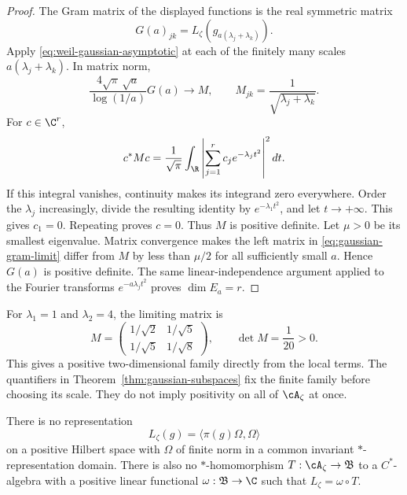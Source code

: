 \begin{proof}
The Gram matrix of the displayed functions is the real symmetric matrix
\[
 G(a)_{jk}=L_\zeta(g_{a(\lambda_j+\lambda_k)}).
\]
Apply \eqref{eq:weil-gaussian-asymptotic} at each of the finitely many
scales $a(\lambda_j+\lambda_k)$.  In matrix norm,
\begin{equation}
 \frac{4\sqrt\pi\,\sqrt a}{\log(1/a)}G(a)
 \longrightarrow M,
 \qquad M_{jk}=\frac1{\sqrt{\lambda_j+\lambda_k}}.
 \label{eq:gaussian-gram-limit}
\end{equation}
For $c\in\C^r$,
\begin{equation}
 c^*Mc=\frac1{\sqrt\pi}\int_{\R}
       \left|\sum_{j=1}^r c_j e^{-\lambda_j t^2}\right|^2dt.
 \label{eq:limiting-gaussian-gram}
\end{equation}
If this integral vanishes, continuity makes its integrand zero everywhere.
Order the $\lambda_j$ increasingly, divide the resulting identity by
$e^{-\lambda_1t^2}$, and let $t\to+\infty$.
This gives $c_1=0$.  Repeating proves $c=0$.
Thus $M$ is positive definite.
Let $\mu>0$ be its smallest eigenvalue.  Matrix convergence makes the
left matrix in \eqref{eq:gaussian-gram-limit} differ from $M$ by less
than $\mu/2$ for all sufficiently small $a$.
Hence $G(a)$ is positive definite.
The same linear-independence argument applied to the Fourier transforms
$e^{-a\lambda_jt^2}$ proves $\dim E_a=r$.
\end{proof}

For $\lambda_1=1$ and $\lambda_2=4$, the limiting matrix is
\[
 M=\begin{pmatrix}1/\sqrt2&1/\sqrt5\\1/\sqrt5&1/\sqrt8\end{pmatrix},
 \qquad\det M=\frac1{20}>0.
\]
This gives a positive two-dimensional family directly from the local terms.
The quantifiers in Theorem~\ref{thm:gaussian-subspaces} fix the finite family
before choosing its scale.  They do not imply positivity on all of
$\cA_\zeta$ at once.

\begin{corollary}
\label{cor:weil-carriers}
There is no representation
\[
 L_\zeta(g)=\langle\pi(g)\Omega,\Omega\rangle
\]
on a positive Hilbert space with $\Omega$ of finite norm in a common
invariant $*$-representation domain.
There is also no $*$-homomorphism $T:\cA_\zeta\to\mathfrak B$ to a
$C^*$-algebra with a positive linear functional
$\omega:\mathfrak B\to\C$ such that $L_\zeta=\omega\circ T$.
\end{corollary}

